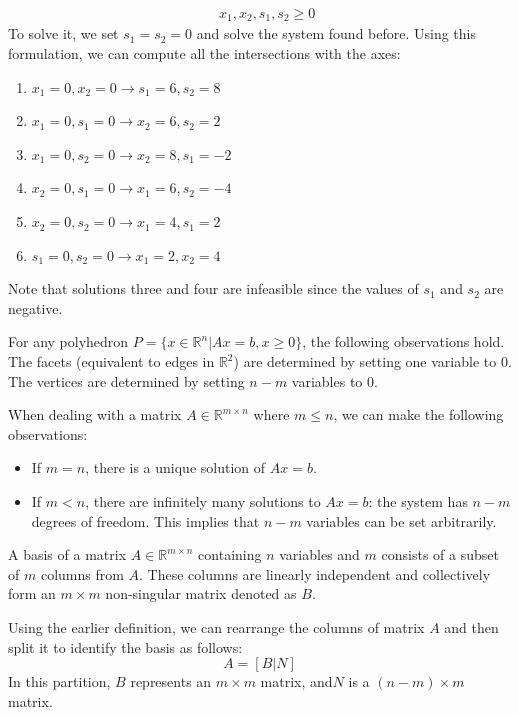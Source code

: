 \begin{example}
\begin{align*}
                                    &\: x_1,x_2,s_1,s_2 \geq 0
    \end{align*}
    To solve it, we set $s_1=s_2=0$ and solve the system found before.
    Using this formulation, we can compute all the intersections with the axes:
    \begin{enumerate}
        \item $x_1=0,x_2=0 \rightarrow s_1=6,s_2=8$
        \item $x_1=0,s_1=0 \rightarrow x_2=6,s_2=2$
        \item $x_1=0,s_2=0 \rightarrow x_2=8,s_1=-2$
        \item $x_2=0,s_1=0 \rightarrow x_1=6,s_2=-4$
        \item $x_2=0,s_2=0 \rightarrow x_1=4,s_1=2$
        \item $s_1=0,s_2=0 \rightarrow x_1=2,x_2=4$
    \end{enumerate}
    Note that solutions three and four are infeasible since the values of $s_1$ and $s_2$ are negative. 
\end{example}
\begin{property}
    For any polyhedron $P = \{x \in \mathbb{R}^n|Ax = b,x \geq 0\}$, the following observations hold. 
    The facets (equivalent to edges in $\mathbb{R}^2$) are determined by setting one variable to 0. 
    The vertices are determined by setting $n-m$ variables to 0. 
\end{property}

When dealing with a matrix  $A \in \mathbb{R}^{m \times n}$ where $m \leq n$, we can make the following observations:
\begin{itemize}
    \item If $m=n$, there is a unique solution of $Ax = b$.
    \item If $m<n$, there are infinitely many solutions to  $Ax = b$: the system has $n-m$ degrees of freedom. 
        This implies that $n-m$ variables can be set arbitrarily. 
\end{itemize}
\begin{definition}
    A basis of a matrix $A \in \mathbb{R}^{m \times n}$ containing  $n$ variables and $m$ consists of a subset of $m$ columns from $A$. 
    These columns are linearly independent and collectively form an $m \times m$ non-singular matrix denoted as $B$. 
\end{definition}
Using the earlier definition, we can rearrange the columns of matrix $A$ and then split it to identify the basis as follows:
\[A=\left[ B|N \right]\]
In this partition, $B$ represents an $m \times m$ matrix, and$N$ is a $(n-m) \times m$ matrix.

